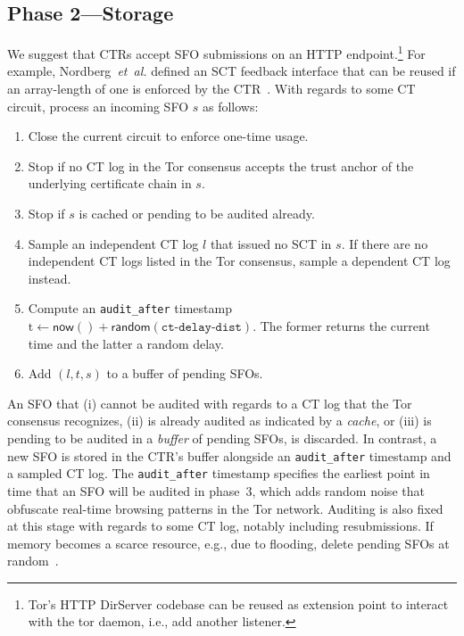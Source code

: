 \subsection{Phase 2---Storage} \label{sec:base:phase2}
We suggest that CTRs accept SFO submissions on an HTTP endpoint.\footnote{%
	Tor's HTTP DirServer codebase can be reused as extension point to interact
	with the tor daemon, i.e., add another listener.
} For example, Nordberg~\emph{et~al.} defined an SCT feedback interface that can
be reused if an array-length of one is enforced by the CTR~\cite{nordberg}.
With regards to some CT circuit, process an incoming SFO $s$ as follows:
\begin{enumerate}
	\item\label{enm:storage:close} Close the current circuit to enforce one-time
		usage.
	\item\label{enm:storage:unrecognized} Stop if no CT log in the Tor consensus
		accepts the trust anchor of the underlying certificate chain in $s$.
	\item\label{enm:storage:cached}
		Stop if $s$ is cached or pending to be audited already.
	\item\label{enm:storage:fix-log} Sample an independent CT log $l$ that
		issued no SCT in $s$.  If there are no independent CT logs listed in the
		Tor consensus, sample a dependent CT log instead.
	\item\label{enm:storage:audit-after} Compute an \texttt{audit\_after}
		timestamp $\textrm{t} \gets \mathsf{now()} +
			\mathsf{random}(\texttt{ct-delay-dist})$.
		The former returns the current time and the latter a random delay.
	\item\label{enm:storage:store} Add $(l,t,s)$ to a buffer of pending SFOs.
\end{enumerate}

An SFO that
	(i) cannot be audited with regards to a CT log that the Tor consensus
		recognizes,
	(ii) is already audited as indicated by a \emph{cache}, or
	(iii) is pending to be audited in a \emph{buffer} of pending SFOs,
is discarded.  In contrast, a new SFO is stored in the CTR's buffer
alongside an \texttt{audit\_after} timestamp and a sampled CT log.  The
\texttt{audit\_after} timestamp specifies the earliest point in time that an SFO
will be audited in phase~3, which adds random noise that obfuscate real-time
browsing patterns in the Tor network.  Auditing is also fixed at this stage with
regards to some CT log, notably including resubmissions.  If memory becomes a
scarce resource, e.g., due to flooding, delete pending SFOs at
random~\cite{nordberg}.


